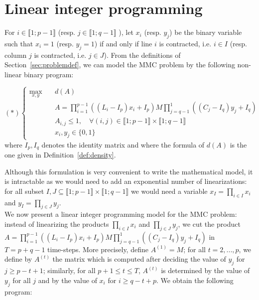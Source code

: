 
\section{Linear integer programming}
\label{sec:linearprog}

For $i \in \llbracket 1; p-1 \rrbracket$ (resp.  $j \in \llbracket 1; q-1 \rrbracket$ ), let $x_i$ (resp. $y_j$) be the binary variable such that $x_i=1$ (resp. $y_j=1$) if and only if line $i$ is contracted, i.e. $i \in I$ (resp. column $j$ is contracted, i.e. $j \in J$). From the definitions of Section~\ref{sec:problemdef}, we can model the MMC problem by the following non-linear binary program:

\begin{equation*}
(\ast)\left\{
\begin{array}{lll}
\max\limits_{x,y}  \quad	& d(A)  \\
& A= \prod\limits_{i=1}^{p-1}((L_i-I_p)x_i+I_p)M\prod\limits_{j=q-1}^{1}((C_j-I_q)y_j+I_q) \\
& A_{i,j} \le 1, \quad \forall (i,j) \in \llbracket 1; p-1 \rrbracket \times \llbracket 1; q-1 \rrbracket \\
& x_i,y_j \in \{0,1\}
\end{array}\right.
\end{equation*}
where $I_p,I_q$ denotes the identity matrix and where the formula of $d(A)$ is the one given in Definition~\ref{def:density}.

\noindent Although this formulation is very convenient to write the mathematical model, it is intractable as we would need to add an exponential number of linearizations: for all subset $ I,J \subseteq \llbracket 1; p-1 \rrbracket \times \llbracket 1; q-1 \rrbracket$ we would need a variable $x_I=\prod\limits_{i \in I}x_i $ and $y_I=\prod\limits_{j \in J}y_j $.\\

\noindent We now present a linear integer programming model for the MMC problem: instead of linearizing the products $\prod\limits_{i \in I}x_i$ and $\prod\limits_{j \in J}y_j$, we cut the product \\
$A= \prod\limits_{i=1}^{p-1}((L_i-I_p)x_i+I_p)M\prod\limits_{j=q-1}^{1}((C_j-I_q)y_j+I_q) $ in $T=p+q-1$ time-steps. More precisely, define $A^{(1)}=M$; for all $t=2,...,p$, we define by $A^{(t)}$ the matrix which is computed after deciding the value of $y_j$ for $j \ge p-t+1$; similarly, for all $p+1\le t \le T$, $A^{(t)}$ is determined by the value of $y_j$ for all $j$ and by the value of $x_i$ for $i \ge q -t+p $. We obtain the following program:

